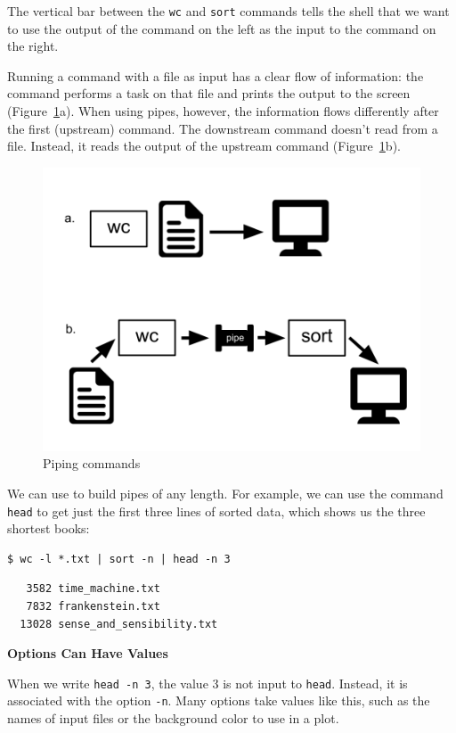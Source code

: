 \documentclass[
]{krantz}
\renewenvironment{quote}{\begin{VF}}{\end{VF}}
\begin{document}
The vertical bar \texttt{\textbar{}} between the \texttt{wc} and \texttt{sort} commands
tells the shell that we want to use the output of the command on the left
as the input to the command on the right.

Running a command with a file as input has a clear flow of information:
the command performs a task on that file and prints the output to the screen
(Figure~\ref{fig:bash-basics-pipe}a).
When using pipes, however,
the information flows differently after the first (upstream) command.
The downstream command doesn't read from a file.
Instead,
it reads the output of the upstream command
(Figure~\ref{fig:bash-basics-pipe}b).

\begin{figure}

{\centering \includegraphics[width=0.8\linewidth]{figures/bash-basics/pipe} 

}

\caption{Piping commands}\label{fig:bash-basics-pipe}
\end{figure}

We can use \texttt{\textbar{}} to build pipes of any length.
For example,
we can use the command \texttt{head} to get just the first three lines of sorted data,
which shows us the three shortest books:

\begin{verbatim}
$ wc -l *.txt | sort -n | head -n 3
\end{verbatim}

\begin{verbatim}
   3582 time_machine.txt
   7832 frankenstein.txt
  13028 sense_and_sensibility.txt
\end{verbatim}

\begin{quote}
\textbf{Options Can Have Values}

When we write \texttt{head\ -n\ 3},
the value 3 is not input to \texttt{head}.
Instead, it is associated with the option \texttt{-n}.
Many options take values like this,
such as the names of input files or the background color to use in a plot.
\end{quote}
\end{document}
